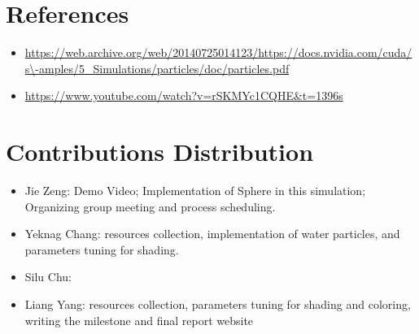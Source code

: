 \documentclass{article}
\newcommand\footurl[1]{\footnote{\url{#1}}}
\newcommand\urllink[2]{#1\footurl{#2}}
\begin{document}
\section{References}
\begin{itemize}
    \item \url{https://web.archive.org/web/20140725014123/https://docs.nvidia.com/cuda/s\-amples/5_Simulations/particles/doc/particles.pdf}
    \item 
    \url{https://www.youtube.com/watch?v=rSKMYc1CQHE&t=1396s}
\end{itemize}


\section{Contributions Distribution}
\begin{itemize}
    \item Jie Zeng: Demo Video; Implementation of Sphere in this simulation; Organizing group meeting and process scheduling.
    \item Yeknag Chang: resources collection, implementation of water particles, and parameters tuning for shading.
    \item Silu Chu: 
    \item Liang Yang: resources collection, parameters tuning for shading and coloring, writing the milestone and final report website
\end{itemize}
    







\end{document}
